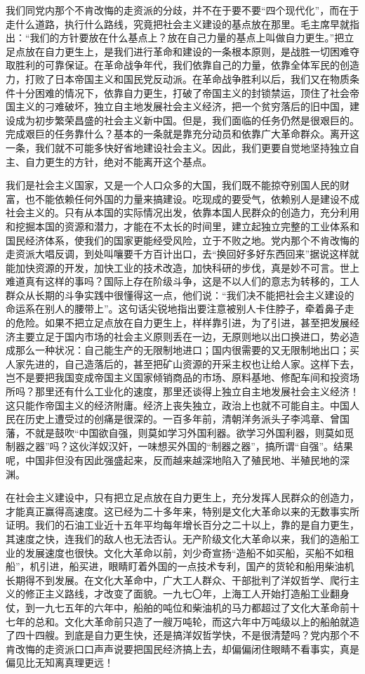 \begin{maonote}
我们同党内那个不肯改悔的走资派的分歧，并不在于要不要“四个现代化”，而在于走什么道路，执行什么路线，究竟把社会主义建设的基点放在那里。毛主席早就指出：“我们的方针要放在什么基点上？放在自己力量的基点上叫做自力更生。”把立足点放在自力更生上，是我们进行革命和建设的一条根本原则，是战胜一切困难夺取胜利的可靠保证。在革命战争年代，我们依靠自己的力量，依靠全体军民的创造力，打败了日本帝国主义和国民党反动派。在革命战争胜利以后，我们又在物质条件十分困难的情况下，依靠自力更生，打破了帝国主义的封锁禁运，顶住了社会帝国主义的刁难破坏，独立自主地发展社会主义经济，把一个贫穷落后的旧中国，建设成为初步繁荣昌盛的社会主义新中国。但是，我们面临的任务仍然是很艰巨的。完成艰巨的任务靠什么？基本的一条就是靠充分动员和依靠广大革命群众。离开这一条，我们就不可能多快好省地建设社会主义。因此，我们更要自觉地坚持独立自主、自力更生的方针，绝对不能离开这个基点。

我们是社会主义国家，又是一个人口众多的大国，我们既不能掠夺别国人民的财富，也不能依赖任何外国的力量来搞建设。吃现成的要受气，依赖别人是建设不成社会主义的。只有从本国的实际情况出发，依靠本国人民群众的创造力，充分利用和挖掘本国的资源和潜力，才能在不太长的时间里，建立起独立完整的工业体系和国民经济体系，使我们的国家更能经受风险，立于不败之地。党内那个不肯改悔的走资派大唱反调，到处叫嚷要千方百计出口，去“换回好多好东西回来”据说这样就能加快资源的开发，加快工业的技术改造，加快科研的步伐，真是妙不可言。世上难道真有这样的事吗？国际上存在阶级斗争，这是不以人们的意志为转移的，工人群众从长期的斗争实践中很懂得这一点，他们说：“我们决不能把社会主义建设的命运系在别人的腰带上”。这句话尖锐地指出要注意被别人卡住脖子，牵着鼻子走的危险。如果不把立足点放在自力更生上，样样靠引进，为了引进，甚至把发展经济主要立足于国内市场的社会主义原则丢在一边，无原则地以出口换进口，势必造成那么一种状况：自己能生产的无限制地进口；国内很需要的又无限制地出口；买人家先进的，自己造落后的，甚至把矿山资源的开采主权也让给人家。这样下去，岂不是要把我国变成帝国主义国家倾销商品的市场、原料基地、修配车间和投资场所吗？那里还有什么工业化的速度，那里还谈得上独立自主地发展社会主义经济！这只能作帝国主义的经济附庸。经济上丧失独立，政治上也就不可能自主。中国人民在历史上遭受过的创痛是很深的。一百多年前，清朝洋务派头子李鸿章、曾国藩，不就是鼓吹“中国欲自强，则莫如学习外国利器。欲学习外国利器，则莫如觅制器之器”吗？这伙洋奴汉奸，一味想买外国的“制器之器”，搞所谓“自强”。结果呢，中国非但没有因此强盛起来，反而越来越深地陷入了殖民地、半殖民地的深渊。

在社会主义建设中，只有把立足点放在自力更生上，充分发挥人民群众的创造力，才能真正赢得高速度。这已经为二十多年来，特别是文化大革命以来的无数事实所证明。我们的石油工业近十五年平均每年增长百分之二十以上，靠的是自力更生，其速度之快，连我们的敌人也无法否认。无产阶级文化大革命以来，我们的造船工业的发展速度也很快。文化大革命以前，刘少奇宣扬“造船不如买船，买船不如租船”，机引进，船买进，眼睛盯着外国的一点技术专利，国产的货轮和船用柴油机长期得不到发展。在文化大革命中，广大工人群众、干部批判了洋奴哲学、爬行主义的修正主义路线，才改变了面貌。一九七〇年，上海工人开始打造船工业翻身仗，到一九七五年的六年中，船舶的吨位和柴油机的马力都超过了文化大革命前十七年的总和。文化大革命前只造了一艘万吨轮，而这六年中万吨级以上的船舶就造了四十四艘。到底是自力更生快，还是搞洋奴哲学快，不是很清楚吗？党内那个不肯改悔的走资派口口声声说要把国民经济搞上去，却偏偏闭住眼睛不看事实，真是偏见比无知离真理更远！


\end{maonote}
